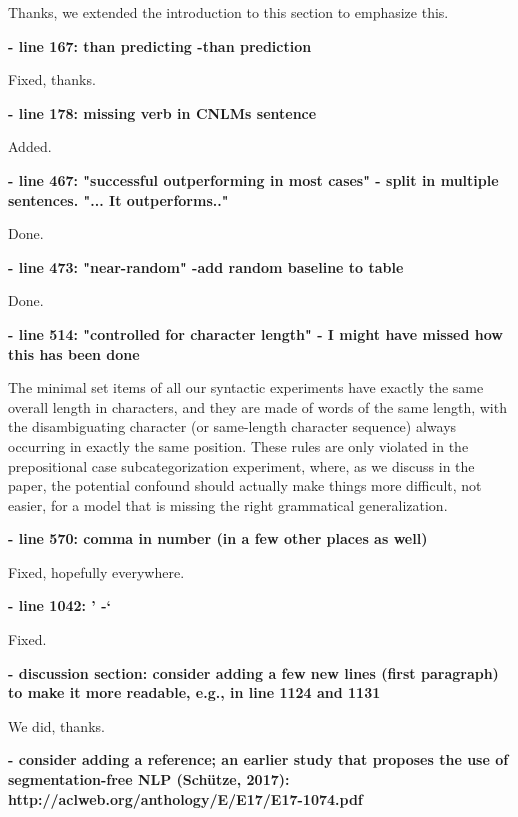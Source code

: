 \documentclass{article}[11pt,a4paper,oneside]
\begin{document}
Thanks, we extended the introduction to this section to emphasize this.\newline

\textbf{- line 167: than predicting -than prediction}

Fixed, thanks.\newline

\textbf{- line 178: missing verb in CNLMs sentence}

Added.\newline

\textbf{- line 467: "successful outperforming in most cases" - split in multiple
sentences. "... It outperforms.."}

Done.\newline

\textbf{- line 473: "near-random" -add random baseline to table}

Done.\newline

\textbf{- line 514: "controlled for character length" - I might have missed how this
has been done}

The minimal set items of all our syntactic experiments have exactly the same overall length in characters, and they are made of words of the same length, with the disambiguating character (or same-length character sequence) always occurring in exactly the same position. These rules are only violated in the prepositional case subcategorization experiment, where, as we discuss in the paper, the potential confound should actually make things more difficult, not easier, for a model that is missing the right grammatical generalization. \newline

\textbf{- line 570: comma in number (in a few other places as well)}

Fixed, hopefully everywhere.\newline

\textbf{- line 1042: ' -`}

Fixed.\newline

\textbf{- discussion section: consider adding a few new lines (first paragraph) to
make it more readable, e.g., in line 1124 and 1131}

We did, thanks.\newline

\textbf{- consider adding a reference; an earlier study that proposes the use of
segmentation-free NLP (Schütze, 2017):
http://aclweb.org/anthology/E/E17/E17-1074.pdf}
\end{document}
